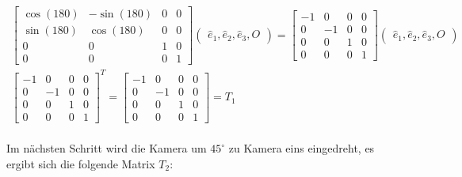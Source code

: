 \begin{gather}
	\begin{bmatrix}
		\cos(180)&-\sin(180)&0&0\\
		\sin(180)&\cos(180)&0&0\\
		0&0&1&0\\
		0&0&0&1
	\end{bmatrix}
	\begin{pmatrix}
		\hat{e}_1,\hat{e}_2,\hat{e}_3,O
	\end{pmatrix}
	=
	\begin{bmatrix}
		-1&0&0&0\\
		0&-1&0&0\\
		0&0&1&0\\
		0&0&0&1
	\end{bmatrix} 
	\begin{pmatrix}
		\hat{e}_1,\hat{e}_2,\hat{e}_3,O
	\end{pmatrix}\\
	\begin{bmatrix}
		-1&0&0&0\\
		0&-1&0&0\\
		0&0&1&0\\
		0&0&0&1
	\end{bmatrix}^T =\begin{bmatrix}
	-1&0&0&0\\
	0&-1&0&0\\
	0&0&1&0\\
	0&0&0&1
	\end{bmatrix}= T_1
\end{gather}\\

Im nächsten Schritt wird die Kamera um \ensuremath{45^\circ} zu Kamera eins eingedreht, es ergibt sich die folgende Matrix \ensuremath{T_2}:

